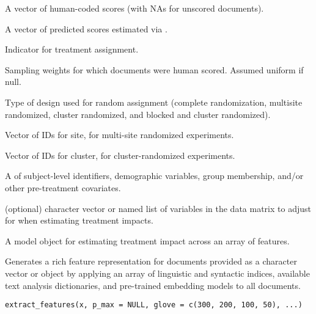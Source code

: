 \documentclass[a4paper]{book}
\begin{document}
%
\begin{Arguments}
\begin{ldescription}
\item[\code{y.obs}] A vector of human-coded scores (with NAs for unscored documents).

\item[\code{yhat}] A vector of predicted scores estimated via .

\item[\code{Z}] Indicator for treatment assignment.

\item[\code{wts}] Sampling weights for which documents were human scored.  Assumed uniform if null.

\item[\code{design}] Type of design used for random assignment (complete
randomization, multisite randomized, cluster randomized, and blocked and cluster randomized).

\item[\code{siteID}] Vector of IDs for site, for multi-site randomized experiments.

\item[\code{clusterID}] Vector of IDs for cluster, for cluster-randomized experiments.

\item[\code{data}] A  of subject-level identifiers, demographic
variables, group membership, and/or other pre-treatment covariates.

\item[\code{adjust}] (optional) character vector or named list of variables in the data matrix to
adjust for when estimating treatment impacts.
\end{ldescription}
\end{Arguments}
%
\begin{Value}
A model object for estimating treatment impact across an array of features.
\end{Value}
%
\begin{Description}\relax
Generates a rich feature representation for documents provided as a character vector or  object
by applying an array of linguistic and syntactic indices, available text analysis dictionaries,
and pre-trained embedding models to all documents.
\end{Description}
%
\begin{Usage}
\begin{verbatim}
extract_features(x, p_max = NULL, glove = c(300, 200, 100, 50), ...)
\end{verbatim}
\end{Usage}
\end{document}
